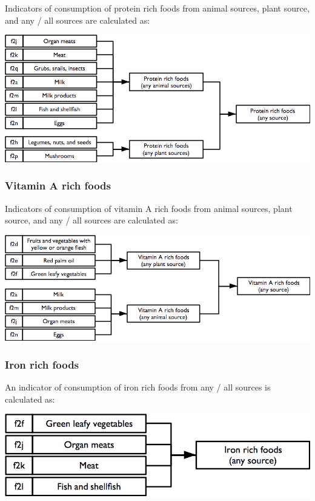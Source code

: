 \documentclass[12pt,a4paper]{book}
\theoremstyle{definition}
\theoremstyle{definition}
\theoremstyle{definition}
\theoremstyle{remark}
\begin{document}
Indicators of consumption of protein rich foods from animal sources,
plant source, and any / all sources are calculated as:

\begin{center}\includegraphics[width=800pt]{figures/indicators09} \end{center}

\hypertarget{vitamin-a-rich-foods}{%
\subsubsection{Vitamin A rich foods}\label{vitamin-a-rich-foods}}

Indicators of consumption of vitamin A rich foods from animal sources,
plant source, and any / all sources are calculated as:

\begin{center}\includegraphics[width=800pt]{figures/indicators10} \end{center}

\hypertarget{iron-rich-foods}{%
\subsubsection{Iron rich foods}\label{iron-rich-foods}}

An indicator of consumption of iron rich foods from any / all sources is
calculated as:

\begin{center}\includegraphics[width=800pt]{figures/indicators11} \end{center}
\end{document}
